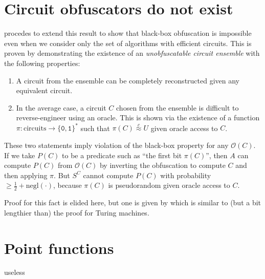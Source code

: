 \documentclass[10pt,twocolumn]{article}
\def\zero{\texttt{0}}
\def\one{\texttt{1}}
\def\bit{{\ensuremath{\{\zero,\one\}}}}
\def\obf{\ensuremath{\mathcal{O}}}
\def\negl{\text{negl}}
\def\cind{{\ensuremath{\stackrel{c}{\approx}}}}
\begin{document}
    \section{Circuit obfuscators do not exist}

    \cite{onThe(Im)possibility} procedes to extend this result to show that black-box obfuscation is
    impossible even when we consider only the set of algorithms with efficient circuits.
    This is proven by demonstrating the existence of an \textit{unobfuscatable circuit ensemble}
    with the following properties:%

    \begin{enumerate}
      \item A circuit from the ensemble can be completely reconstructed given any equivalent circuit.
      \item In the average case, a circuit $C$ chosen from the ensemble is difficult to reverse-engineer using an oracle.
      This is shown via the existence of a function $\pi: \text{circuits}\to\bit^*$ such that $\pi(C)\cind U$
      given oracle access to $C$.
    \end{enumerate}

    These two statements imply violation of the black-box property for any $\obf(C)$.
    If we take $P(C)$ to be a predicate such as ``the first bit $\pi(C)$'',
    then $A$ can compute $P(C)$ from $\obf(C)$ by inverting the obfuscation to compute $C$ and then applying $\pi$.
    But $S^C$ cannot compute $P(C)$ with probability $\ge \frac{1}{2}+\negl(\cdot)$,
    because $\pi(C)$ is pseudorandom given oracle access to $C$.

    Proof for this fact is elided here, but one is given by \cite{onThe(Im)possibility}
    which is similar to (but a bit lengthier than) the proof for Turing machines.

  \section{Point functions}

    useless

  
  
\end{document}
